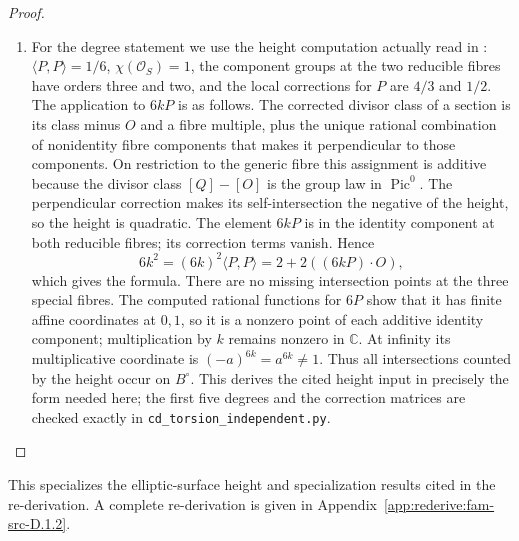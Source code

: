 \begin{proof}
\begin{enumerate}[label=\arabic*.,leftmargin=*]
\item For the degree statement we use the height computation actually read in
\cite[Lemma 2.1 and proof]{Engel2026}: \(\langle P,P\rangle=1/6\),
\(\chi(\mathcal O_S)=1\), the component groups at the two reducible fibres
have orders three and two, and the local corrections for \(P\) are
\(4/3\) and \(1/2\). The application to \(6kP\) is as follows.
The corrected divisor class of a section is its class minus \(O\) and
a fibre multiple, plus the unique rational combination of nonidentity
fibre components that makes it perpendicular to those components.
On restriction to the generic fibre this assignment is additive because
the divisor class \([Q]-[O]\) is the group law in \(\operatorname{Pic}^0\).
The perpendicular correction makes its self-intersection the negative of
the height, so the height is quadratic. The element \(6kP\) is in the
identity component at both reducible fibres; its correction terms vanish.
Hence
\[
 6k^2=(6k)^2\langle P,P\rangle
 =2+2((6kP)\mathbin{\cdot}O),
\]
which gives the formula. There are no missing intersection points at the
three special fibres. The computed rational functions for \(6P\) show
that it has finite affine coordinates at \(0,1\), so it is a nonzero point
of each additive identity component; multiplication by \(k\) remains
nonzero in \(\mathbb C\). At infinity its multiplicative coordinate is
\((-a)^{6k}=a^{6k}\ne1\). Thus all intersections counted by the height
occur on \(B^\circ\). This derives the cited height input in precisely
the form needed here; the first five degrees and the correction matrices
are checked exactly in \texttt{cd\_torsion\_independent.py}.
\end{enumerate}
\end{proof}



This specializes the elliptic-surface height and specialization results cited in the re-derivation. A complete re-derivation is given in Appendix~\ref{app:rederive:fam-src-D.1.2}.


